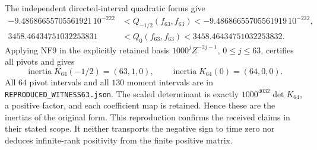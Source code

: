 The independent directed-interval quadratic forms give
\[
\begin{aligned}
-9.48686655705561921\,10^{-222}
 &<Q_{-1/2}(f_{63},f_{63})
 <-9.48686655705561919\,10^{-222},\\
3458.46434751032253831
 &<Q_0(f_{63},f_{63})
 <3458.46434751032253832.
\end{aligned}\tag{RPX6}
\]
Applying NF9 in the explicitly retained basis
$1000^jZ^{-2j-1}$, $0\le j\le63$, certifies all pivots and gives
\[
 \operatorname{inertia}K_{64}(-1/2)=(63,1,0),\qquad
 \operatorname{inertia}K_{64}(0)=(64,0,0).
 \tag{RPX7}
\]
All $64$ pivot intervals and all $130$ moment intervals are in
\texttt{REPRODUCED\_WITNESS63.json}. The scaled determinant
is exactly $1000^{4032}\det K_{64}$, a positive factor, and
each coefficient map is retained. Hence these are the inertias
of the original form. This reproduction confirms the received
claims in their stated scope. It neither transports the
negative sign to time zero nor deduces infinite-rank positivity
from the finite positive matrix.

\endgroup
